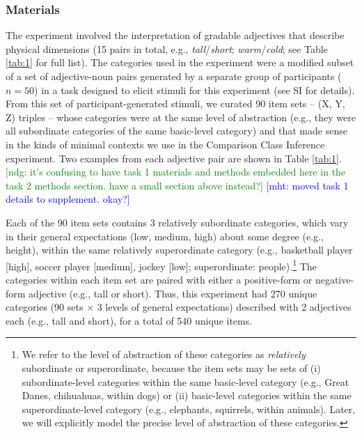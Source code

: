 \documentclass[doc]{apa6}
\newcommand{\ndg}[1]{\textcolor{Green}{[ndg: #1]}}
\newcommand{\mht}[1]{\textcolor{Blue}{[mht: #1]}}
\begin{document}
\subsubsection{Materials}

The experiment involved the interpretation of gradable adjectives that describe physical dimensions (15 pairs in total, e.g., \emph{tall}/\emph{short}; \emph{warm}/\emph{cold}; see Table \ref{tab:1} for full list). 
The categories used in the experiment were a modified subset of a set of adjective-noun pairs generated by a separate group of participants ($n=50$) in a task designed to elicit stimuli for this experiment (see SI for details). 
From this set of participant-generated stimuli, we curated 90 item sets -- (X, Y, Z)  triples -- whose categories were at the same level of abstraction  (e.g., they were all subordinate categories of the same basic-level category) and that made sense in the kinds of minimal contexts we use in the Comparison Class Inference experiment.
Two examples from each adjective pair are shown in Table \ref{tab:1}. 
\ndg{it's confusing to have task 1 materials and methods embedded here in the task 2 methods section. have a small section above instead?}
\mht{moved task 1 details to supplement. okay?}

Each of the 90 item sets contains 3 relatively subordinate categories, which vary in their general expectations (low, medium, high) about some degree (e.g., height), within the same relatively superordinate category (e.g., basketball player [high], soccer player [medium], jockey [low]; superordinate: people).\footnote{
We refer to the level of abstraction of these categories as \emph{relatively} subordinate or superordinate, because the item sets may be sets of (i) subordinate-level categories within the same basic-level category (e.g., Great Danes, chihuahuas, within dogs) or (ii) basic-level categories within the same superordinate-level category (e.g., elephants, squirrels, within animals). Later, we will explicitly model the precise level of abstraction of these categories.
}
The categories within each item set are paired with either a positive-form or negative-form adjective (e.g., tall or short). 
Thus, this experiment had 270 unique categories (90 sets $\times$ 3 levels of general expectations) described with 2 adjectives each (e.g., tall and short), for a total of 540 unique items.
\end{document}
